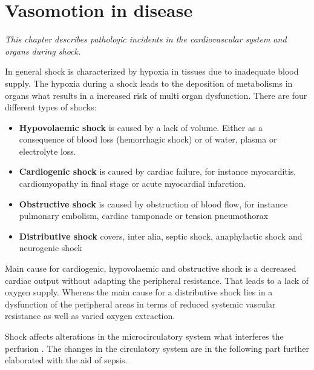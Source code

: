 \chapter{Vasomotion in disease}
\textit{This chapter describes pathologic incidents in the cardiovascular system and organs during shock.}

In general shock is characterized by hypoxia in tissues due to inadequate blood supply. The hypoxia during a shock leads to the deposition of metabolisms in organs what results in a increased risk of multi organ dysfunction. 
There are four different types of shocks: \cite{lauridsen2015,vincent2013}
\begin{itemize}
	\item \textbf{Hypovolaemic shock} is caused by a lack of volume. Either as a consequence of blood loss (hemorrhagic shock) or of water, plasma or electrolyte loss.
	\item \textbf{Cardiogenic shock} is caused by cardiac failure, for instance myocarditis, cardiomyopathy in final stage or acute myocardial infarction.
	\item \textbf{Obstructive shock} is caused by obstruction of blood flow, for instance pulmonary embolism, cardiac tamponade or tension pneumothorax 
	\item \textbf{Distributive shock} covers, inter alia, septic shock, anaphylactic shock and neurogenic shock
\end{itemize}

Main cause for cardiogenic, hypovolaemic and obstructive shock is a decreased cardiac output without adapting the peripheral resistance. That leads to a lack of oxygen supply.
Whereas the main cause for a distributive shock lies in a dysfunction of the peripheral areas in terms of reduced systemic vascular resistance as well as varied oxygen extraction. \cite{vincent2013}

Shock affects alterations in the microcirculatory system what interferes the perfusion \cite{maier2013}. The changes in the circulatory system are in the following part further elaborated with the aid of sepsis.